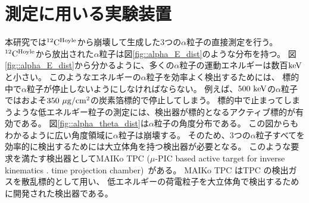 \section{測定に用いる実験装置}
本研究では${}^{12}{\rm C}^{\rm Hoyle}$から崩壊して生成した3つの$\alpha$粒子の直接測定を行う。
${}^{12}{\rm C}^{\rm Hoyle}$から放出された$\alpha$粒子は図\ref{fig::alpha_E_dist}のような分布を持つ。
図\ref{fig::alpha_E_dist}から分かるように、多くの$\alpha$粒子の運動エネルギーは数百${\rm keV}$と小さい。
このようなエネルギーの$\alpha$粒子を効率よく検出するためには、
標的中で$\alpha$粒子が停止しないようにしなければならない。
例えば、$500~{\rm keV}$の$\alpha$粒子ではおよそ$350~{\rm \mu g/cm^2}$の炭素箔標的で停止してしまう。
標的中で止まってしまうような低エネルギー粒子の測定には、検出器が標的となるアクティブ標的が有効である。
図\ref{fig::alpha_theta_dist}は$\alpha$粒子の角度分布である。
この図からもわかるように広い角度領域に$\alpha$粒子は崩壊する。
そのため、3つの$\alpha$粒子すべてを効率的に検出するためには大立体角を持つ検出器が必要となる。
このような要求を満たす検出器としてMAIKo TPC ($\mu$-PIC based active target for inverse kinematics .
time projection chamber)~\cite{maiko, mupic}がある。
MAIKo TPC はTPC の検出ガスを散乱標的として用い、
低エネルギーの荷電粒子を大立体角で検出するために開発された検出器である。
